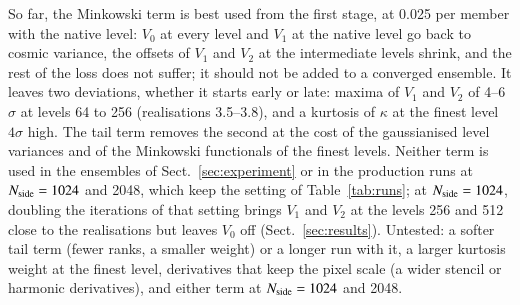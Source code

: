 \documentclass{aa}
\newcommand{\nside}{N_{\rm side}}
\begin{document}
So far, the Minkowski term is best used from the first stage, at 0.025 per member with the native level: $V_0$ at every level and $V_1$ at the native level go back to cosmic variance, the offsets of $V_1$ and $V_2$ at the intermediate levels shrink, and the rest of the loss does not suffer; it should not be added to a converged ensemble. It leaves two deviations, whether it starts early or late: maxima of $V_1$ and $V_2$ of 4--6$\sigma$ at levels 64 to 256 (realisations 3.5--3.8), and a kurtosis of $\kappa$ at the finest level $4\sigma$ high. The tail term removes the second at the cost of the gaussianised level variances and of the Minkowski functionals of the finest levels. Neither term is used in the ensembles of Sect.~\ref{sec:experiment} or in the production runs at $\nside=1024$ and 2048, which keep the setting of Table~\ref{tab:runs}; at $\nside=1024$, doubling the iterations of that setting brings $V_1$ and $V_2$ at the levels 256 and 512 close to the realisations but leaves $V_0$ off (Sect.~\ref{sec:results}). Untested: a softer tail term (fewer ranks, a smaller weight) or a longer run with it, a larger kurtosis weight at the finest level, derivatives that keep the pixel scale (a wider stencil or harmonic derivatives), and either term at $\nside=1024$ and 2048.
\end{document}
